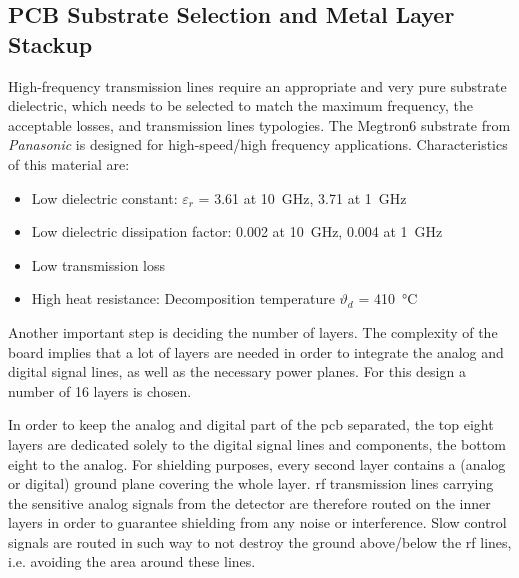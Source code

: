\subsection{PCB Substrate Selection and Metal Layer Stackup}\label{ssec:substrate}
High-frequency transmission lines require an appropriate and very pure substrate dielectric, which needs to be selected to match the maximum frequency, the acceptable losses, and transmission lines typologies.
The Megtron6 substrate from \textit{Panasonic} is designed for high-speed/high frequency applications. 
Characteristics of this material are:
\begin{itemize}
\item Low dielectric constant: $\varepsilon_r$ = 3.61 at \SI{10}{\giga \hertz}, 3.71 at \SI{1}{\giga \hertz}
\item Low dielectric dissipation factor: 0.002 at \SI{10}{\giga \hertz}, 0.004 at \SI{1}{\giga \hertz}
\item Low transmission loss
\item High heat resistance: Decomposition temperature $\vartheta_d$ = \SI{410}{\celsius} 
\end{itemize}

Another important step is deciding the number of layers. The complexity of the board implies that a lot of layers are needed in order to integrate the analog and digital signal lines, as well as the necessary power planes.
For this design a number of 16 layers is chosen.

In order to keep the analog and digital part of the \gls{pcb} separated, the top eight layers are dedicated solely to the digital signal lines and components, the bottom eight to the analog.
For shielding purposes, every second layer contains a (analog or digital) ground plane covering the whole layer.
\gls{rf} transmission lines carrying the sensitive analog signals from the detector are therefore routed on the inner layers in order to guarantee shielding from any noise or interference.
Slow control signals are routed in such way to not destroy the ground above/below the \gls{rf} lines, i.e. avoiding the area around these lines.

